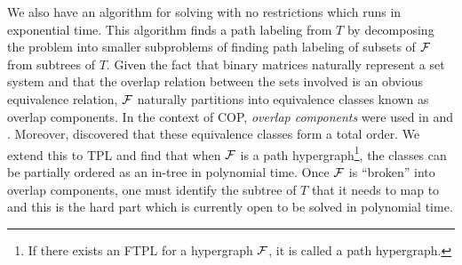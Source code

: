 \documentclass[MS,synopsis]{iitmdiss}
\begin{document}
We also have an algorithm for solving {\CFTPL} with no restrictions
which runs in exponential time. 
This algorithm finds a path labeling from $T$ by decomposing the
problem into smaller subproblems of finding path labeling of subsets
of ${\cal F}$ from subtrees of $T$. Given the fact that binary matrices
naturally represent a set
system %
and that the overlap relation between the sets involved is an obvious
equivalence relation, ${\cal F}$ naturally partitions into equivalence
classes known as overlap components. In the context of COP, {\em overlap
components} were used in \cite{wlh02} and \cite{kklv10}. Moreover,
\cite{nsnrs09} discovered that these equivalence classes form a total
order. We extend this to TPL and find that when ${\cal F}$ is a path
hypergraph\footnote{If there exists an FTPL for a hypergraph ${\cal F}$, it
  is called a path hypergraph.}, the classes can be partially ordered
as an in-tree in polynomial time. Once ${\cal F}$ is
``broken'' into overlap components, one must identify the subtree of
$T$ that it needs to map to and this is the hard part which is
currently open to be solved in polynomial time.




\end{document}
